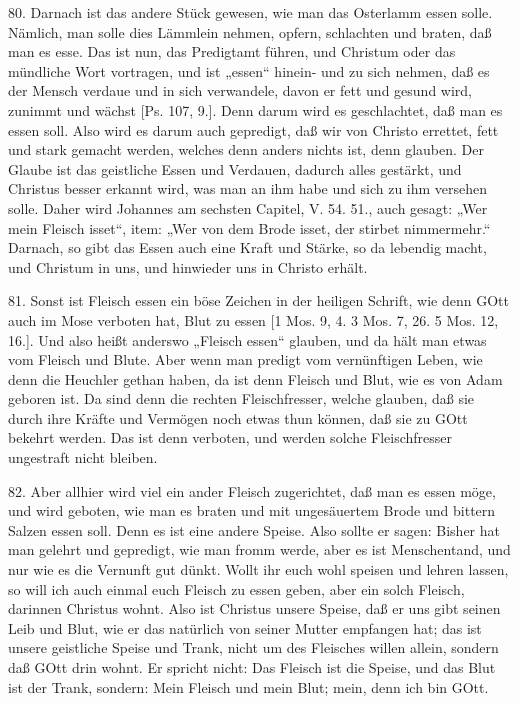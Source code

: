 80. Darnach ist das andere Stück gewesen, wie man das Osterlamm essen solle. Nämlich, man solle dies Lämmlein nehmen, opfern, schlachten und braten, daß man es esse. Das ist nun, das Predigtamt führen, und Christum oder das mündliche Wort vortragen, und ist „essen“ hinein- und zu sich nehmen, daß es der Mensch verdaue und in sich verwandele, davon er fett und gesund wird, zunimmt und wächst [Ps. 107, 9.]. Denn darum wird es geschlachtet, daß man es essen soll. Also wird es darum auch gepredigt, daß wir von Christo errettet, fett und stark gemacht werden, welches denn anders nichts ist, denn glauben. Der Glaube ist das geistliche Essen und Verdauen, dadurch alles gestärkt, und Christus besser erkannt wird, was man an ihm habe und sich zu ihm versehen solle. Daher wird Johannes am sechsten Capitel, V. 54. 51., auch gesagt: „Wer mein Fleisch isset“, item: „Wer von dem Brode isset, der stirbet nimmermehr.“ Darnach, so gibt das Essen auch eine Kraft und Stärke, so da lebendig macht, und Christum in uns, und hinwieder uns in Christo erhält.

81. Sonst ist Fleisch essen ein böse Zeichen in der heiligen Schrift, wie denn GOtt auch im Mose verboten hat, Blut zu essen [1 Mos. 9, 4. 3 Mos. 7, 26. 5 Mos. 12, 16.]. Und also heißt anderswo „Fleisch essen“ glauben, und da hält man etwas vom Fleisch und Blute. Aber wenn man predigt vom vernünftigen Leben, wie denn die Heuchler gethan haben, da ist denn Fleisch und Blut, wie es von Adam geboren ist. Da sind denn die rechten Fleischfresser, welche glauben, daß sie durch ihre Kräfte und Vermögen noch etwas thun können, daß sie zu GOtt bekehrt werden. Das ist denn verboten, und werden solche Fleischfresser ungestraft nicht bleiben.

82. Aber allhier wird viel ein ander Fleisch zugerichtet, daß man es essen möge, und wird geboten, wie man es braten und mit ungesäuertem Brode und bittern Salzen essen soll. Denn es ist eine andere Speise. Also sollte er sagen: Bisher hat man gelehrt und gepredigt, wie man fromm werde, aber es ist Menschentand, und nur wie es die Vernunft gut dünkt. Wollt ihr euch wohl speisen und lehren lassen, so will ich auch einmal euch Fleisch zu essen geben, aber ein solch Fleisch, darinnen Christus wohnt. Also ist Christus unsere Speise, daß er uns gibt seinen Leib und Blut, wie er das natürlich von seiner Mutter empfangen hat; das ist unsere geistliche Speise und Trank, nicht um des Fleisches willen allein, sondern daß GOtt drin wohnt. Er spricht nicht: Das Fleisch ist die Speise, und das Blut ist der Trank, sondern: Mein Fleisch und mein Blut; mein, denn ich bin GOtt.

